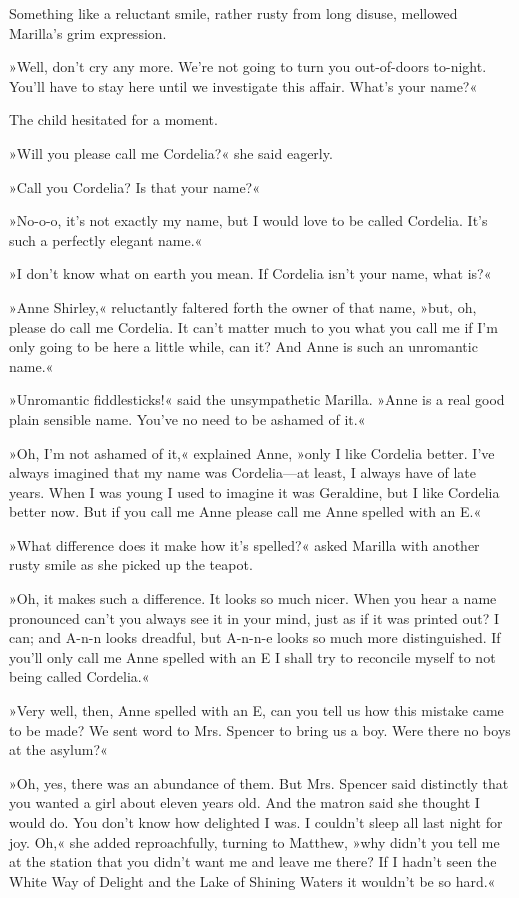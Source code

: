 Something like a reluctant smile, rather rusty from long disuse, mellowed Marilla’s grim expression.

»Well, don’t cry any more. We’re not going to turn you out-of-doors to-night. You’ll have to stay here until we investigate this affair. What’s your name?«

The child hesitated for a moment.

»Will you please call me Cordelia?« she said eagerly.

»Call you Cordelia? Is that your name?«

»No-o-o, it’s not exactly my name, but I would love to be called Cordelia. It’s such a perfectly elegant name.«

»I don’t know what on earth you mean. If Cordelia isn’t your name, what is?«

»Anne Shirley,« reluctantly faltered forth the owner of that name, »but, oh, please do call me Cordelia. It can’t matter much to you what you call me if I’m only going to be here a little while, can it? And Anne is such an unromantic name.«

»Unromantic fiddlesticks!« said the unsympathetic Marilla. »Anne is a real good plain sensible name. You’ve no need to be ashamed of it.«

»Oh, I’m not ashamed of it,« explained Anne, »only I like Cordelia better. I’ve always imagined that my name was Cordelia—at least, I always have of late years. When I was young I used to imagine it was Geraldine, but I like Cordelia better now. But if you call me Anne please call me Anne spelled with an E.«

»What difference does it make how it’s spelled?« asked Marilla with another rusty smile as she picked up the teapot.

»Oh, it makes such a difference. It looks so much nicer. When you hear a name pronounced can’t you always see it in your mind, just as if it was printed out? I can; and A-n-n looks dreadful, but A-n-n-e looks so much more distinguished. If you’ll only call me Anne spelled with an E I shall try to reconcile myself to not being called Cordelia.«

»Very well, then, Anne spelled with an E, can you tell us how this mistake came to be made? We sent word to Mrs. Spencer to bring us a boy. Were there no boys at the asylum?«

»Oh, yes, there was an abundance of them. But Mrs. Spencer said distinctly that you wanted a girl about eleven years old. And the matron said she thought I would do. You don’t know how delighted I was. I couldn’t sleep all last night for joy. Oh,« she added reproachfully, turning to Matthew, »why didn’t you tell me at the station that you didn’t want me and leave me there? If I hadn’t seen the White Way of Delight and the Lake of Shining Waters it wouldn’t be so hard.«

